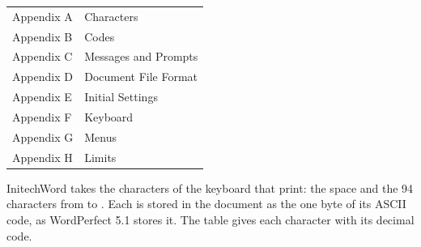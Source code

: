 \begin{tabular}{@{}ll@{}}
Appendix A & Characters\\
Appendix B & Codes\\
Appendix C & Messages and Prompts\\
Appendix D & Document File Format\\
Appendix E & Initial Settings\\
Appendix F & Keyboard\\
Appendix G & Menus\\
Appendix H & Limits\\
\end{tabular}

InitechWord takes the characters of the keyboard that print: the space and
the 94 characters from \Scr{!} to \Scr{\textasciitilde}.  Each is stored in
the document as the one byte of its ASCII code, as WordPerfect 5.1 stores
it.  The table gives each character with its decimal code.

